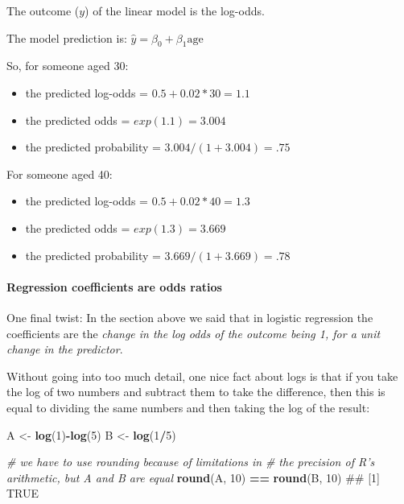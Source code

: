 \documentclass[]{article}
\newenvironment{Shaded}{\begin{snugshade}}{\end{snugshade}}
\newcommand{\KeywordTok}[1]{\textcolor[rgb]{0.13,0.29,0.53}{\textbf{#1}}}
\newcommand{\DecValTok}[1]{\textcolor[rgb]{0.00,0.00,0.81}{#1}}
\newcommand{\StringTok}[1]{\textcolor[rgb]{0.31,0.60,0.02}{#1}}
\newcommand{\CommentTok}[1]{\textcolor[rgb]{0.56,0.35,0.01}{\textit{#1}}}
\newcommand{\OperatorTok}[1]{\textcolor[rgb]{0.81,0.36,0.00}{\textbf{#1}}}
\newcommand{\NormalTok}[1]{#1}
\providecommand{\tightlist}{%
  \setlength{\itemsep}{0pt}\setlength{\parskip}{0pt}}
\let\oldparagraph\paragraph
\renewcommand{\paragraph}[1]{\oldparagraph{#1}\mbox{}}
\theoremstyle{definition}
\theoremstyle{definition}
\theoremstyle{definition}
\theoremstyle{remark}
\begin{document}
The outcome (\(y\)) of the linear model is the log-odds.

The model prediction is: \(\hat{y} = \beta_0 + \beta_1\textrm{age}\)

So, for someone aged 30:

\begin{itemize}
\tightlist
\item
  the predicted log-odds = \(0.5 + 0.02 * 30 = 1.1\)
\item
  the predicted odds = \(exp(1.1) = 3.004\)
\item
  the predicted probability = \(3.004 / (1 + 3.004) = .75\)
\end{itemize}

For someone aged 40:

\begin{itemize}
\tightlist
\item
  the predicted log-odds = \(0.5 + 0.02 * 40 = 1.3\)
\item
  the predicted odds = \(exp(1.3) = 3.669\)
\item
  the predicted probability = \(3.669 / (1 + 3.669) = .78\)
\end{itemize}

\paragraph{Regression coefficients are odds
ratios}\label{regression-coefficients-are-odds-ratios}

One final twist: In the section above we said that in logistic
regression the coefficients are the \emph{change in the log odds of the
outcome being 1, for a unit change in the predictor}.

Without going into too much detail, one nice fact about logs is that if
you take the log of two numbers and subtract them to take the
difference, then this is equal to dividing the same numbers and then
taking the log of the result:

\begin{Shaded}
\begin{Highlighting}[]
\NormalTok{A <-}\StringTok{ }\KeywordTok{log}\NormalTok{(}\DecValTok{1}\NormalTok{)}\OperatorTok{-}\KeywordTok{log}\NormalTok{(}\DecValTok{5}\NormalTok{) }
\NormalTok{B  <-}\StringTok{ }\KeywordTok{log}\NormalTok{(}\DecValTok{1}\OperatorTok{/}\DecValTok{5}\NormalTok{)}


\CommentTok{# we have to use rounding because of limitations in }
\CommentTok{# the precision of R's arithmetic, but A and B are equal}
\KeywordTok{round}\NormalTok{(A, }\DecValTok{10}\NormalTok{) }\OperatorTok{==}\StringTok{ }\KeywordTok{round}\NormalTok{(B, }\DecValTok{10}\NormalTok{)}
\NormalTok{## [1] TRUE}
\end{Highlighting}
\end{Shaded}
\end{document}
